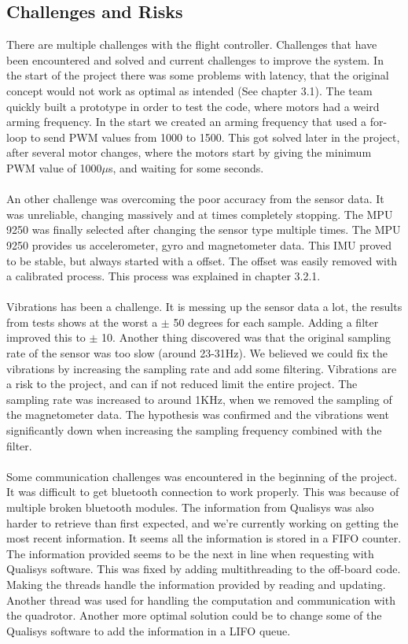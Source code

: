 \subsection{Challenges and Risks}
There are multiple challenges with the flight controller. Challenges that have been encountered and solved and current challenges to improve the system.
In the start of the project there was some problems with latency, that the original concept would not work as optimal as intended (See chapter 3.1). The team quickly built a prototype in order to test the code, where motors had a weird arming frequency. In the start we created an arming frequency that used a for-loop to send PWM values from 1000 to 1500. This got solved later in the project, after several motor changes, where the motors start by giving the minimum PWM value of 1000$\mu$s, and waiting for some seconds. 
\\\\
An other challenge was overcoming the poor accuracy from the sensor data. It was unreliable, changing massively and at times completely stopping. The MPU 9250 was finally selected after changing the sensor type multiple times. The MPU 9250 provides us accelerometer, gyro and magnetometer data. This IMU proved to be stable, but always started with a offset. The offset was easily removed with a calibrated process. This process was explained in chapter 3.2.1.
\\\\
Vibrations has been a challenge. It is messing up the sensor data a lot, the results from tests shows at the worst a $\pm$ 50 degrees for each sample. Adding a filter improved this to $\pm$ 10. Another thing discovered was that the original sampling rate of the sensor was too slow (around 23-31Hz). We believed we could fix the vibrations by increasing the sampling rate and add some filtering. Vibrations are a risk to the project, and can if not reduced limit the entire project. The sampling rate was increased to around 1KHz, when we removed the sampling of the magnetometer data. The hypothesis was confirmed and the vibrations went significantly down when increasing the sampling frequency combined with the filter. 
\\\\
Some communication challenges was encountered in the beginning of the project. It was difficult to get bluetooth connection to work properly. This was because of multiple broken bluetooth modules. The information from Qualisys was also harder to retrieve than first expected, and we're currently working on getting the most recent information. It seems all the information is stored in a FIFO counter. The information provided seems to be the next in line when requesting with Qualisys software. This was fixed by adding multithreading to the off-board code. Making the threads handle the information provided by reading and updating. Another thread was used for handling the computation and communication with the quadrotor. Another more optimal solution could be to change some of the Qualisys software to add the information in a LIFO queue.

